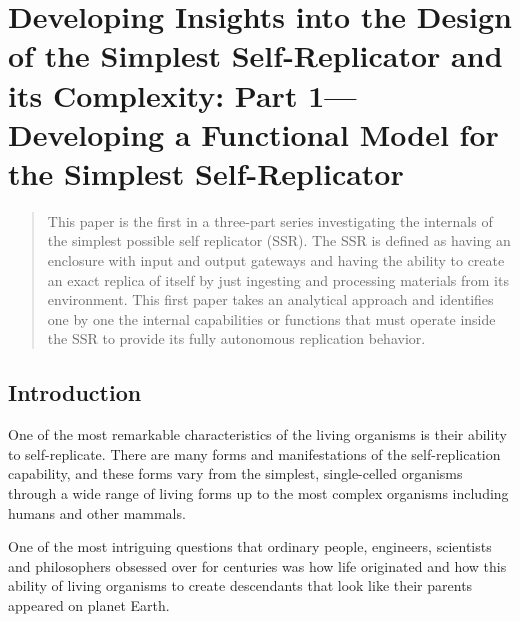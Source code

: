 
\newcommand\migneafigure[3]{
	\begin{figure}
		\centering
		\texttt{[image: \#1]}
		\caption{{#2}}
		\label{#3}
	\end{figure}
}
\newcommand\mterm[1]{\emph{#1}}
\newcommand\memph[1]{\emph{#1}}

\chapter[The Simplest Self-Replicator, Part 1]{Developing Insights into the Design of the Simplest Self-Replicator and its Complexity: Part 1---Developing a Functional Model for the Simplest Self-Replicator}


\begin{abstract}
This paper is the first in a three-part series investigating the internals 
of the simplest possible self replicator (SSR). 
The SSR is defined as having an enclosure with input
and output gateways and having the ability to create an exact replica
of itself by just ingesting and processing materials from its
environment. This first paper takes an analytical approach and identifies one
by one the internal capabilities or functions that must operate inside
the SSR to provide its fully autonomous replication behavior. 
\end{abstract}

\section{Introduction}

One of the most remarkable characteristics of the living organisms is
their ability to self-replicate. There are many forms and
manifestations of the self-replication capability, and these forms vary
from the simplest, single-celled organisms through a wide range of
living forms up to the most complex organisms including humans and
other mammals.

One of the most intriguing questions that ordinary people, engineers,
scientists and philosophers obsessed over for centuries was how life
originated and how this ability of living organisms to create
descendants that look like their parents appeared on planet Earth. 

